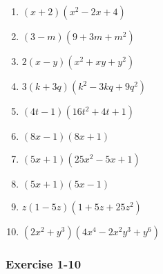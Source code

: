 {\begin{multicols}{3}
\begin{enumerate}[noitemsep, label=\textbf{\arabic*}. ] 
\item $(x + 2)(x^2 - 2x + 4)$%
\item $(3 - m)(9 + 3m + m^2)$%
\item $2(x - y)(x^2 + xy + y^2)$%
\item $3(k + 3q)(k^2 - 3kq + 9q^2)$%
\item $(4t - 1)(16t^2 + 4t + 1)$%
\item $(8x - 1)(8x + 1)$%
\item $(5x + 1)(25x^2 - 5x + 1)$%
\item $(5x + 1)(5x - 1)$%
\item $z(1 - 5z)(1 + 5z + 25z^2)$%
\item $(2x^2 + y^3)(4x^4 - 2x^2y^3 + y^6)$%
\end{enumerate}



\subsubsection*{Exercise 1-10} %



\end{multicols}}
